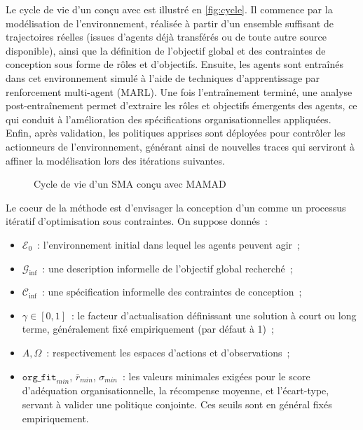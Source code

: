 Le cycle de vie d'un  conçu avec  est illustré en \autoref{fig:cycle}. Il commence par la modélisation de l'environnement, réalisée à partir d'un ensemble suffisant de trajectoires réelles (issues d'agents déjà transférés ou de toute autre source disponible), ainsi que la définition de l'objectif global et des contraintes de conception sous forme de rôles et d'objectifs. Ensuite, les agents sont entraînés dans cet environnement simulé à l'aide de techniques d'apprentissage par renforcement multi-agent (MARL). Une fois l'entraînement terminé, une analyse post-entraînement permet d'extraire les rôles et objectifs émergents des agents, ce qui conduit à l'amélioration des spécifications organisationnelles appliquées. Enfin, après validation, les politiques apprises sont déployées pour contrôler les actionneurs de l'environnement, générant ainsi de nouvelles traces qui serviront à affiner la modélisation lors des itérations suivantes.

\begin{figure}[h!]
  \centering
  
  \caption{Cycle de vie d'un SMA conçu avec MAMAD}
  \label{fig:cycle}
\end{figure}

Le coeur de la méthode  est d'envisager la conception d'un  comme un processus itératif d'optimisation sous contraintes. On suppose donnés~:
\begin{itemize}
  \item $\mathcal{E}_0$~: l'environnement initial dans lequel les agents peuvent agir~;
  \item $\mathcal{G}_{\text{inf}}$~: une description informelle de l'objectif global recherché~;
  \item $\mathcal{C}_{\text{inf}}$~: une spécification informelle des contraintes de conception~;
  \item $\gamma \in [0,1]$~: le facteur d'actualisation définissant une solution à court ou long terme, généralement fixé empiriquement (par défaut à 1)~;
  \item $A, \Omega$~: respectivement les espaces d'actions et d'observations~;
  \item $\texttt{org\_fit}_{min}$, $\overline{r}_{min}$, $\sigma_{min}$~: les valeurs minimales exigées pour le score d'adéquation organisationnelle, la récompense moyenne, et l'écart-type, servant à valider une politique conjointe. Ces seuils sont en général fixés empiriquement.
\end{itemize}

